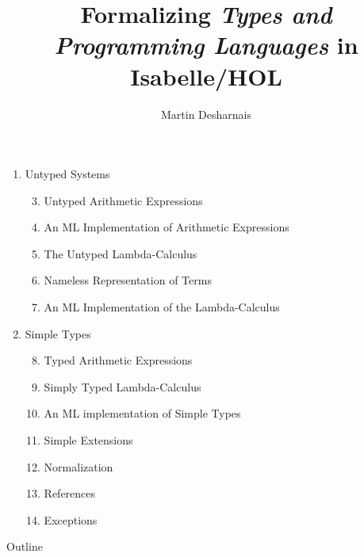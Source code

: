 \documentclass[xcolor=dvipsnames]{beamer}
\title[Formalizing \emph{TAPL} in Isabelle/HOL]
{Formalizing \emph{Types and Programming Languages} in Isabelle/HOL}
\author{Martin Desharnais}
\institute[ÉTS]{École de technologie supérieure}
\date{}
\begin{document}
\begin{frame}
  \titlepage
\end{frame}

\begin{frame}
  \footnotesize
  \begin{center}
    \begin{varwidth}{\textwidth}
      \begin{enumerate}[label=\Roman*]
        \itemsep 1pt
        \item Untyped Systems \hfill
          \begin{enumerate}[label=§ \arabic*]
            \setcounter{enumii}{2}
            \item \textcolor{OliveGreen}{Untyped Arithmetic Expressions}
            \item An ML Implementation of Arithmetic Expressions
            \item \textcolor{OliveGreen}{The Untyped Lambda-Calculus}
            \item \textcolor{OliveGreen}{Nameless Representation of Terms}
            \item An ML Implementation of the Lambda-Calculus
          \end{enumerate}
        \item Simple Types \hfill
          \begin{enumerate}[label=§ \arabic*]
            \setcounter{enumii}{7}
            \item \textcolor{OliveGreen}{Typed Arithmetic Expressions}
            \item \textcolor{OliveGreen}{Simply Typed Lambda-Calculus}
            \item An ML implementation of Simple Types
            \item Simple Extensions
            \item Normalization
            \item References
            \item Exceptions
          \end{enumerate}
      \end{enumerate}
    \end{varwidth}
  \end{center}
\end{frame}

\begin{frame}{Outline}
  \tableofcontents
\end{frame}
\end{document}
